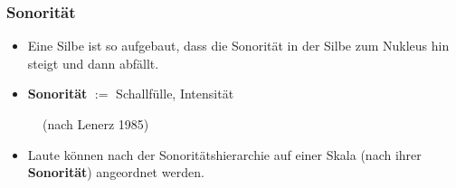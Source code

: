 \begin{frame}
\frametitle{Sonorität}

\begin{itemize}
	\item Eine Silbe ist so aufgebaut, dass die Sonorität in der Silbe zum Nukleus hin steigt und dann abfällt.

	\item \textbf{Sonorität} $:=$ Schallfülle, Intensität

\end{itemize}

\begin{figure}
	\centering
	\caption{\citet[93]{Ramers08a} (nach Lenerz 1985)}
\end{figure}

\begin{itemize}
	\item Laute können nach der Sonoritätshierarchie auf einer Skala (nach ihrer \textbf{Sonorität}) angeordnet werden.
\end{itemize}

\end{frame}


